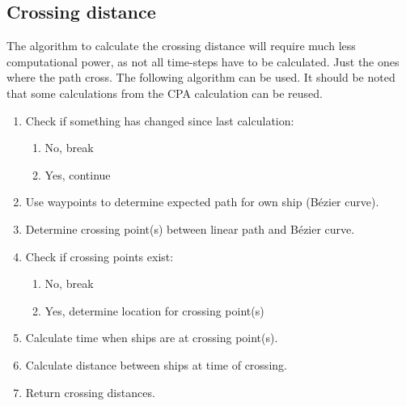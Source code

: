 \subsection{Crossing distance}
The algorithm to calculate the crossing distance will require much less computational power, as not all time-steps have to be calculated. Just the ones where the path cross. The following algorithm can be used. It should be noted that some calculations from the CPA calculation can be reused.
\begin{enumerate}
	\item Check if something has changed since last calculation:
	\begin{enumerate}
		\item No, break
		\item Yes, continue
	\end{enumerate}
	\item Use waypoints to determine expected path for own ship (Bézier curve).
	\item Determine crossing point(s) between linear path and Bézier curve.
	\item Check if crossing points exist:
	\begin{enumerate}
		\item No, break
		\item Yes, determine location for crossing point(s)
	\end{enumerate}
	\item Calculate time when ships are at crossing point(s).
	\item Calculate distance between ships at time of crossing.
	\item Return crossing distances.
\end{enumerate}